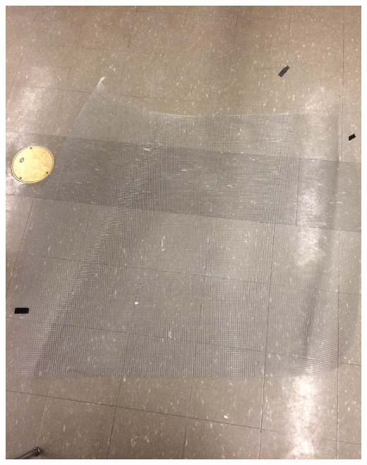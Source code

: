 \documentclass[11pt]{article} %
\begin{document}
\begin{center}
\includegraphics[scale=0.12]{dish/08.jpeg}
\end{center}
\end{document}
